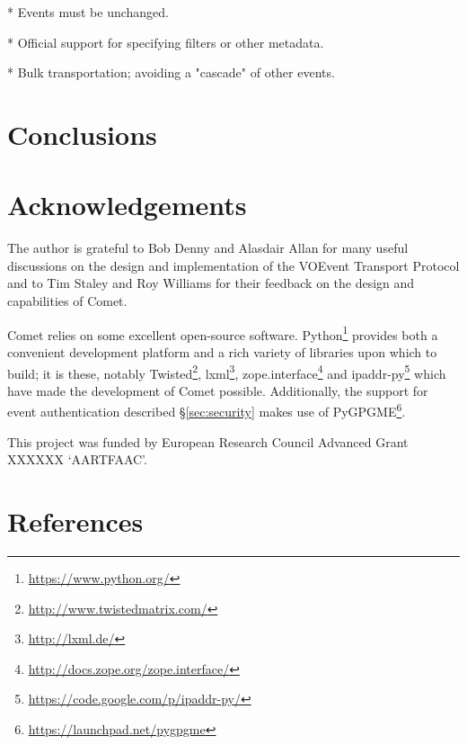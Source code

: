 \documentclass[5p,authoryear]{elsarticle}
\begin{document}
* Events must be unchanged.

* Official support for specifying filters or other metadata.

* Bulk transportation; avoiding a "cascade" of other events.

\section{Conclusions}
\label{sec:conclusions}

\section{Acknowledgements}
\label{sec:ack}

The author is grateful to Bob Denny and Alasdair Allan for many useful
discussions on the design and implementation of the VOEvent Transport Protocol
and to Tim Staley and Roy Williams for their feedback on the design and
capabilities of Comet.

Comet relies on some excellent open-source software.
Python\footnote{\url{https://www.python.org/}} provides both a convenient
development platform and a rich variety of libraries upon which to build; it
is these, notably Twisted\footnote{\url{http://www.twistedmatrix.com/}},
lxml\footnote{\url{http://lxml.de/}},
zope.interface\footnote{\url{http://docs.zope.org/zope.interface/}} and
ipaddr-py\footnote{\url{https://code.google.com/p/ipaddr-py/}} which have made
the development of Comet possible. Additionally, the support for event
authentication described \S\ref{sec:security} makes use of
PyGPGME\footnote{\url{https://launchpad.net/pygpgme}}.

This project was funded by European Research Council Advanced Grant XXXXXX
`AARTFAAC'.

\section*{References}



\end{document}
